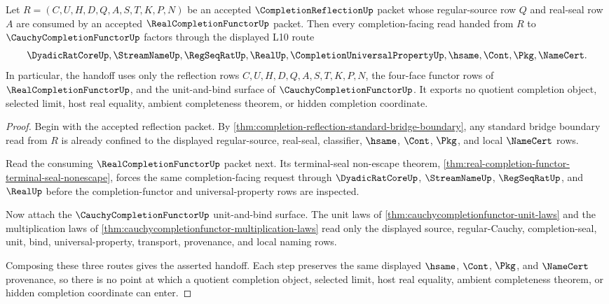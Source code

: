 \begin{theorem}
\label{thm:completionreflection-real-completion-functor-handoff}
Let $R=(C,U,H,D,Q,A,S,T,K,P,N)$ be an accepted $\CompletionReflectionUp$ packet whose regular-source row $Q$ and real-seal row $A$ are consumed by an accepted $\RealCompletionFunctorUp$ packet. Then every completion-facing read handed from $R$ to $\CauchyCompletionFunctorUp$ factors through the displayed L10 route
$$
\DyadicRatCoreUp,\StreamNameUp,\RegSeqRatUp,\RealUp,\CompletionUniversalPropertyUp,\hsame,\Cont,\Pkg,\NameCert .
$$
In particular, the handoff uses only the reflection rows $C,U,H,D,Q,A,S,T,K,P,N$, the four-face functor rows of $\RealCompletionFunctorUp$, and the unit-and-bind surface of $\CauchyCompletionFunctorUp$. It exports no quotient completion object, selected limit, host real equality, ambient completeness theorem, or hidden completion coordinate.
\end{theorem}
\begin{proof}
Begin with the accepted reflection packet. By \autoref{thm:completion-reflection-standard-bridge-boundary}, any standard bridge boundary read from $R$ is already confined to the displayed regular-source, real-seal, classifier, $\hsame$, $\Cont$, $\Pkg$, and local $\NameCert$ rows.

Read the consuming $\RealCompletionFunctorUp$ packet next. Its terminal-seal non-escape theorem, \autoref{thm:real-completion-functor-terminal-seal-nonescape}, forces the same completion-facing request through $\DyadicRatCoreUp$, $\StreamNameUp$, $\RegSeqRatUp$, and $\RealUp$ before the completion-functor and universal-property rows are inspected.

Now attach the $\CauchyCompletionFunctorUp$ unit-and-bind surface. The unit laws of \autoref{thm:cauchycompletionfunctor-unit-laws} and the multiplication laws of \autoref{thm:cauchycompletionfunctor-multiplication-laws} read only the displayed source, regular-Cauchy, completion-seal, unit, bind, universal-property, transport, provenance, and local naming rows.

Composing these three routes gives the asserted handoff. Each step preserves the same displayed $\hsame$, $\Cont$, $\Pkg$, and $\NameCert$ provenance, so there is no point at which a quotient completion object, selected limit, host real equality, ambient completeness theorem, or hidden completion coordinate can enter.
\end{proof}

